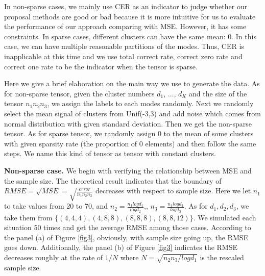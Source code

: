 \documentclass{article}
\begin{document}
In non-sparse cases, we mainly use CER as an indicator to judge whether our proposal methods are good or bad because it is more intuitive for us to evaluate the performance of our approach comparing with MSE. However, it has some constraints. In sparse cases, different clusters can have the same mean: 0. In this case, we can have multiple reasonable partitions of the modes. Thus, CER is inapplicable at this time and we use  total correct rate, correct zero rate and correct one rate to be the indicator when the tensor is sparse.
\par


Here we give a brief elaboration on the main way we use to generate the data. As for non-sparse tensor, given the cluster numbers $d_1$, ..., $d_K$ and the size of the tensor $n_1n_2n_3$, we assign the labels to each modes randomly. Next we randomly select the mean signal of clusters from Unif(-3,3) and add noise which comes from normal distribution with given standard deviation. Then we get the non-sparse tensor. As for sparse tensor, we randomly assign 0 to the mean of some  clusters with given sparsity rate (the proportion of 0 elements) and then follow the same steps. We name this kind of tensor as tensor with constant clusters.\par 

\textbf{Non-sparse case.} We begin with verifying the relationship between MSE and the sample size. The theoretical result indicates that the boundary of $RMSE=\sqrt{MSE}= \sqrt{\frac{error}{n_1n_2n_3}}$ decreases with respect to sample size. Here we let $n_1$ to take values from 20 to 70, and $n_2=\frac{n_1logd_1}{logd_2}$,, $n_3 = \frac{n_1logd_1}{logd_3}$. As for $d_1, d_2, d_3$, we take them from $\{(4,4,4),(4,8,8),(8,8,8),(8,8,12)\}$. We simulated each situation 50 times and get the average RMSE among those cases. According to the panel (a) of Figure \ref{fig3}, obviously, with sample size going up, the RMSE goes down. Additionally, the panel (b) of Figure \ref{fig3} indicates the RMSE decreases roughly at the rate of $1/N$ where $N=\sqrt{n_2n_3/logd_1}$ is the rescaled sample size.\par 
\end{document}

